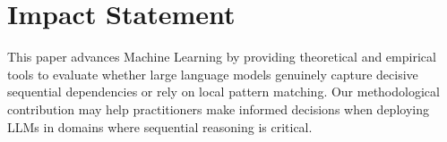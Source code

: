\documentclass{article}
\theoremstyle{plain}
\theoremstyle{definition}
\theoremstyle{remark}
\begin{document}
\section*{Impact Statement}

This paper advances Machine Learning by providing theoretical and empirical tools to evaluate whether large language models genuinely capture decisive sequential dependencies or rely on local pattern matching. Our methodological contribution may help practitioners make informed decisions when deploying LLMs in domains where sequential reasoning is critical.






\nocite{langley00}
\newpage






\newpage
\appendix
\onecolumn
\end{document}
